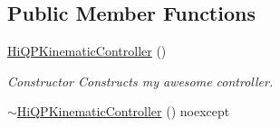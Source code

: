 \subsection*{Public Member Functions}
\begin{DoxyCompactItemize}
\item 
\hypertarget{classhiqp_1_1HiQPKinematicController_a3dd9c3d69dc2a4beafe67b1b5ac2de50}{\hyperlink{classhiqp_1_1HiQPKinematicController_a3dd9c3d69dc2a4beafe67b1b5ac2de50}{Hi\-Q\-P\-Kinematic\-Controller} ()}\label{classhiqp_1_1HiQPKinematicController_a3dd9c3d69dc2a4beafe67b1b5ac2de50}

\begin{DoxyCompactList}\small\item\em Constructor Constructs my awesome controller. \end{DoxyCompactList}\item 
\hypertarget{classhiqp_1_1HiQPKinematicController_a4d99b3f5ef8059e22c4826726ebc3327}{\hyperlink{classhiqp_1_1HiQPKinematicController_a4d99b3f5ef8059e22c4826726ebc3327}{$\sim$\-Hi\-Q\-P\-Kinematic\-Controller} () noexcept}\label{classhiqp_1_1HiQPKinematicController_a4d99b3f5ef8059e22c4826726ebc3327}


\end{DoxyCompactItemize}
